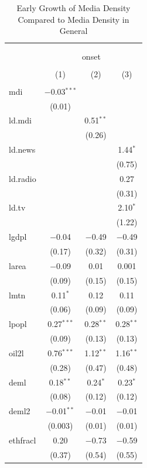 \documentclass[11pt,article,oneside]{memoir}
\begin{document}
\begin{table}[!htbp] \centering 
  \caption{Early Growth of Media Density Compared to Media Density in General} 
  \label{} 
\footnotesize 
\begin{tabular}{@{\extracolsep{5pt}}lccc} 
\\[-1.8ex]\hline \\[-1.8ex] 
\\[-1.8ex] & \multicolumn{3}{c}{onset} \\ 
\\[-1.8ex] & (1) & (2) & (3)\\ 
\hline \\[-1.8ex] 
 mdi & $-$0.03$^{***}$ &  &  \\ 
  & (0.01) &  &  \\ 
  ld.mdi &  & 0.51$^{**}$ &  \\ 
  &  & (0.26) &  \\ 
  ld.news &  &  & 1.44$^{*}$ \\ 
  &  &  & (0.75) \\ 
  ld.radio &  &  & 0.27 \\ 
  &  &  & (0.31) \\ 
  ld.tv &  &  & 2.10$^{*}$ \\ 
  &  &  & (1.22) \\ 
  lgdpl & $-$0.04 & $-$0.49 & $-$0.49 \\ 
  & (0.17) & (0.32) & (0.31) \\ 
  larea & $-$0.09 & 0.01 & 0.001 \\ 
  & (0.09) & (0.15) & (0.15) \\ 
  lmtn & 0.11$^{*}$ & 0.12 & 0.11 \\ 
  & (0.06) & (0.09) & (0.09) \\ 
  lpopl & 0.27$^{***}$ & 0.28$^{**}$ & 0.28$^{**}$ \\ 
  & (0.09) & (0.13) & (0.13) \\ 
  oil2l & 0.76$^{***}$ & 1.12$^{**}$ & 1.16$^{**}$ \\ 
  & (0.28) & (0.47) & (0.48) \\ 
  deml & 0.18$^{**}$ & 0.24$^{*}$ & 0.23$^{*}$ \\ 
  & (0.08) & (0.12) & (0.12) \\ 
  deml2 & $-$0.01$^{**}$ & $-$0.01 & $-$0.01 \\ 
  & (0.003) & (0.01) & (0.01) \\ 
  ethfracl & 0.20 & $-$0.73 & $-$0.59 \\ 
  & (0.37) & (0.54) & (0.55) \\ 

\end{tabular}
\end{table}
\end{document}
